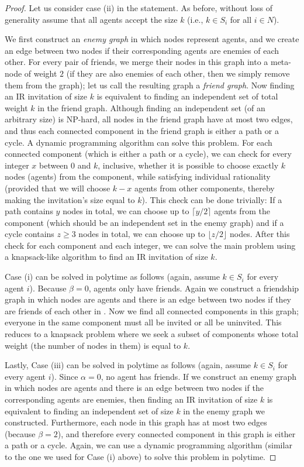 \begin{proof}
	Let us consider case (ii) in the statement. 
	As before, without loss of generality assume that all agents accept the size $k$ (i.e., $k\in S_i$ for all $i\in N$). 
	
	We first construct an {\em enemy graph} in which nodes represent agents, and we create an edge between two nodes if their corresponding agents are enemies of each other. For every pair of friends, we merge their nodes in this graph into a meta-node of weight $2$ (if they are also enemies of each other, then we simply remove them from the graph); let us call the resulting graph a {\em friend graph}. 
	Now finding an IR invitation of size $k$ is equivalent to finding an independent set of total weight $k$ in the friend graph. Although finding an independent set (of an arbitrary size) is NP-hard, all nodes in the friend graph have at most two edges, and thus each connected component in the friend graph is either a path or a cycle. 
	A dynamic programming algorithm can solve this problem.
	For each connected component (which is either a path or a cycle), we can check for every integer $x$ between $0$ and $k$, inclusive, whether it is possible to choose exactly $k$ nodes (agents) from the component, while satisfying individual rationality (provided that we will choose $k-x$ agents from other components, thereby making the invitation's size equal to $k$). This check can be done trivially: If a path contains $y$ nodes in total, we can choose up to $\lceil y/2 \rceil$ agents from the component (which should be an independent set in the enemy graph) and if a cycle contains $z \geq 3$ nodes in total, we can choose up to $\lfloor z/2 \rfloor$ nodes. After this check for each component and each integer, we can solve the main problem using a knapsack-like algorithm to find an IR invitation of size $k$.

 	Case (i) can be solved in polytime as follows (again, assume $k \in S_i$ for every agent $i$). Because $\beta = 0$, agents only have friends. Again we construct a friendship graph in which nodes are agents and there is an edge between two nodes if they are friends of each other in \SIP. Now we find all connected components in this graph; everyone in the same component must all be invited or all be uninvited. This reduces to a knapsack problem where we seek a subset of components whose total weight (the number of nodes in them) is equal to $k$. 

	Lastly, Case (iii) can be solved in polytime as follows (again, assume $k \in S_i$ for every agent $i$).
	Since $\alpha = 0$, no agent has friends. If we construct an enemy graph in which nodes are agents and there is an edge between two nodes if the corresponding agents are enemies, then finding an IR invitation of size $k$ is equivalent to finding an independent set of size $k$ in the enemy graph we constructed. Furthermore, each node in this graph has at most two edges (because $\beta = 2$), and therefore every connected component in this graph is either a path or a cycle. Again, we can use a dynamic programming algorithm (similar to the one we used for Case (i) above) to solve this problem in polytime.


\end{proof}

